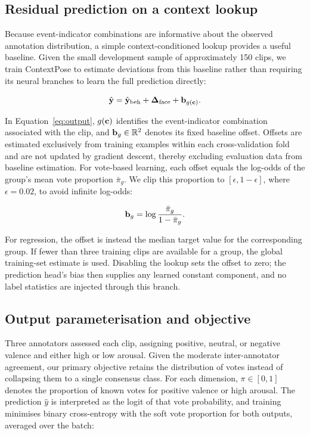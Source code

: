 \subsection{Residual prediction on a context lookup}
\label{sec:residual}

Because event-indicator combinations are informative about the observed annotation distribution, a simple context-conditioned lookup provides a useful baseline. Given the small development sample of approximately 150 clips, we train ContextPose to estimate deviations from this baseline rather than requiring its neural branches to learn the full prediction directly:

\begin{equation}
  \hat{\mathbf{y}} = \hat{\mathbf{y}}_{\text{beh}} + \bm{\Delta}_{\text{face}} + \mathbf{b}_{g(\mathbf{c})}.
  \label{eq:output}
\end{equation}

In Equation~\eqref{eq:output}, $g(\mathbf{c})$ identifies the event-indicator combination associated with the clip, and $\mathbf{b}_{g}\in\mathbb{R}^2$ denotes its fixed baseline offset. Offsets are estimated exclusively from training examples within each cross-validation fold and are not updated by gradient descent, thereby excluding evaluation data from baseline estimation. For vote-based learning, each offset equals the log-odds of the group's mean vote proportion $\bar{\pi}_{g}$. We clip this proportion to $[\epsilon,1-\epsilon]$, where $\epsilon=0.02$, to avoid infinite log-odds:

\begin{equation}
  \mathbf{b}_{g} = \log\frac{\bar{\pi}_{g}}{1-\bar{\pi}_{g}}.
\end{equation}

For regression, the offset is instead the median target value for the corresponding group. If fewer than three training clips are available for a group, the global training-set estimate is used. Disabling the lookup sets the offset to zero; the prediction head's bias then supplies any learned constant component, and no label statistics are injected through this branch.

\subsection{Output parameterisation and objective}
\label{sec:objective}

Three annotators assessed each clip, assigning positive, neutral, or negative valence and either high or low arousal. Given the moderate inter-annotator agreement, our primary objective retains the distribution of votes instead of collapsing them to a single consensus class. For each dimension, $\pi\in[0,1]$ denotes the proportion of known votes for positive valence or high arousal. The prediction $\hat{y}$ is interpreted as the logit of that vote probability, and training minimises binary cross-entropy with the soft vote proportion for both outputs, averaged over the batch:

